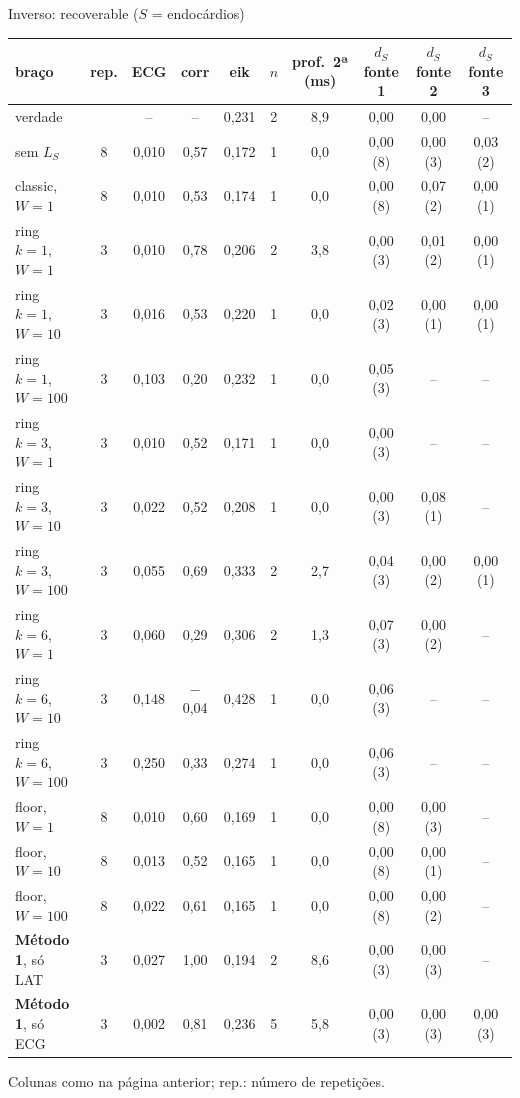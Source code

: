 \begin{frame}[label=tab_recuperavel]{Inverso: recoverable ($S$ = endocárdios)}
  \centering
  \scriptsize
  \setlength{\tabcolsep}{3.7pt}
  \renewcommand{\arraystretch}{0.86}
  \begin{tabular}{@{}lccccccccc@{}}
    \toprule
    braço & rep. & ECG & corr & eik & $n$ & \shortstack{prof.\ 2ª\\(ms)} & \shortstack{$d_S$\\fonte 1} & \shortstack{$d_S$\\fonte 2} & \shortstack{$d_S$\\fonte 3}\\
    \midrule
    verdade &  & -- & -- & 0,231 & 2 & 8,9 & 0,00 & 0,00 & --\\
    sem $L_S$ & 8 & 0,010 & 0,57 & 0,172 & 1 & 0,0 & 0,00 {\tiny(8)} & 0,00 {\tiny(3)} & 0,03 {\tiny(2)}\\
    classic, $W=1$ & 8 & 0,010 & 0,53 & 0,174 & 1 & 0,0 & 0,00 {\tiny(8)} & 0,07 {\tiny(2)} & 0,00 {\tiny(1)}\\
    ring $k=1$, $W=1$ & 3 & 0,010 & 0,78 & 0,206 & 2 & 3,8 & 0,00 {\tiny(3)} & 0,01 {\tiny(2)} & 0,00 {\tiny(1)}\\
    ring $k=1$, $W=10$ & 3 & 0,016 & 0,53 & 0,220 & 1 & 0,0 & 0,02 {\tiny(3)} & 0,00 {\tiny(1)} & 0,00 {\tiny(1)}\\
    ring $k=1$, $W=100$ & 3 & 0,103 & 0,20 & 0,232 & 1 & 0,0 & 0,05 {\tiny(3)} & -- & --\\
    ring $k=3$, $W=1$ & 3 & 0,010 & 0,52 & 0,171 & 1 & 0,0 & 0,00 {\tiny(3)} & -- & --\\
    ring $k=3$, $W=10$ & 3 & 0,022 & 0,52 & 0,208 & 1 & 0,0 & 0,00 {\tiny(3)} & 0,08 {\tiny(1)} & --\\
    ring $k=3$, $W=100$ & 3 & 0,055 & 0,69 & 0,333 & 2 & 2,7 & 0,04 {\tiny(3)} & 0,00 {\tiny(2)} & 0,00 {\tiny(1)}\\
    ring $k=6$, $W=1$ & 3 & 0,060 & 0,29 & 0,306 & 2 & 1,3 & 0,07 {\tiny(3)} & 0,00 {\tiny(2)} & --\\
    ring $k=6$, $W=10$ & 3 & 0,148 & $-$0,04 & 0,428 & 1 & 0,0 & 0,06 {\tiny(3)} & -- & --\\
    ring $k=6$, $W=100$ & 3 & 0,250 & 0,33 & 0,274 & 1 & 0,0 & 0,06 {\tiny(3)} & -- & --\\
    floor, $W=1$ & 8 & 0,010 & 0,60 & 0,169 & 1 & 0,0 & 0,00 {\tiny(8)} & 0,00 {\tiny(3)} & --\\
    floor, $W=10$ & 8 & 0,013 & 0,52 & 0,165 & 1 & 0,0 & 0,00 {\tiny(8)} & 0,00 {\tiny(1)} & --\\
    floor, $W=100$ & 8 & 0,022 & 0,61 & 0,165 & 1 & 0,0 & 0,00 {\tiny(8)} & 0,00 {\tiny(2)} & --\\
    \midrule
    \textbf{Método 1}, só LAT & 3 & 0,027 & 1,00 & 0,194 & 2 & 8,6 & 0,00 {\tiny(3)} & 0,00 {\tiny(3)} & --\\
    \textbf{Método 1}, só ECG & 3 & 0,002 & 0,81 & 0,236 & 5 & 5,8 & 0,00 {\tiny(3)} & 0,00 {\tiny(3)} & 0,00 {\tiny(3)}\\
    \bottomrule
  \end{tabular}\par
  \medskip
  {\tiny Colunas como na página anterior; rep.: número de repetições.}
\end{frame}
